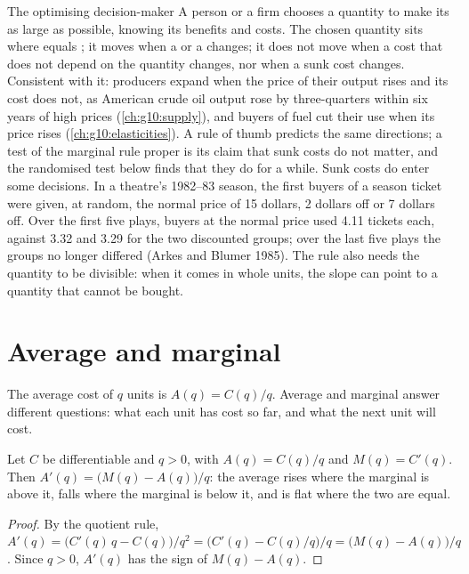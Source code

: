 \begin{model}{The optimising decision-maker}
\assumes A person or a firm chooses a quantity to make its  as large as possible, knowing its benefits and costs.
\predicts The chosen quantity sits where  equals ; it moves when a  or a  changes; it does not move when
  a cost that does not depend on the quantity changes, nor when a sunk cost changes.
\tested Consistent with it: producers expand when the price of their output rises and its cost does not, as American crude oil output rose by
  three-quarters within six years of high prices (\cref{ch:g10:supply}), and buyers of fuel cut their use when its price rises
  (\cref{ch:g10:elasticities}). A rule of thumb predicts the same directions; a test of the marginal rule proper is its claim that sunk costs do
  not matter, and the randomised test below finds that they do for a while.
\breaks Sunk costs do enter some decisions. In a theatre's 1982--83 season, the first buyers of a season ticket were given, at random, the normal price of 15
  dollars, 2 dollars off or 7 dollars off. Over the first five plays, buyers at the normal price used 4.11 tickets each, against 3.32 and 3.29 for the two
  discounted groups; over the last five plays the groups no longer differed (Arkes and Blumer 1985). The rule also needs the quantity to be divisible: when it
  comes in whole units, the slope can point to a quantity that cannot be bought.
\end{model}

\section{Average and marginal}\label{sec:g11:marginal-reasoning:average}

The average cost of $q$ units is $A(q) = C(q)/q$. Average and marginal answer different questions: what each unit has cost so far, and what the next unit will
cost.

\begin{proposition}\label{prop:g11:marginal-reasoning:average}
Let $C$ be differentiable and $q > 0$, with $A(q) = C(q)/q$ and $M(q) = C'(q)$. Then $A'(q) = \big(M(q) - A(q)\big)/q$: the average rises where the marginal is
above it, falls where the marginal is below it, and is flat where the two are equal.
\end{proposition}
\begin{proof}
By the quotient rule, $A'(q) = \big(C'(q)\,q - C(q)\big)/q^2 = \big(C'(q) - C(q)/q\big)/q = \big(M(q) - A(q)\big)/q$. Since $q > 0$, $A'(q)$ has the sign of $M(q) - A(q)$.
\end{proof}

